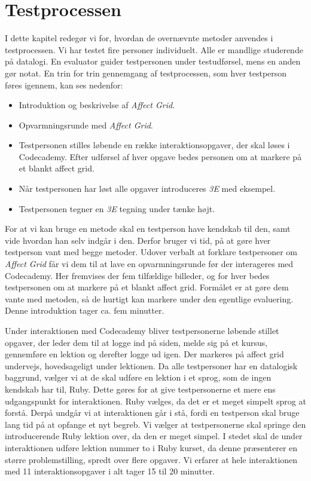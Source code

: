 \chapter{Testprocessen}\label{ch:evaproc}
I dette kapitel redegør vi for, hvordan de overnævnte metoder anvendes i testprocessen. Vi har testet fire personer individuelt. Alle er mandlige studerende på datalogi. En evaluator guider testpersonen under testudførsel, mens en anden gør notat. En trin for trin gennemgang af testprocessen, som hver testperson føres igennem, kan ses nedenfor:

\begin{itemize}
\item Introduktion og beskrivelse af \textit{Affect Grid}.
\item Opvarmningsrunde med \textit{Affect Grid}.
\item Testpersonen stilles løbende en række interaktionsopgaver, der skal løses i Codecademy. Efter udførsel af hver opgave bedes personen om at markere på et blankt affect grid.
\item Når testpersonen har løst alle opgaver introduceres \textit{3E} med eksempel.
\item Testpersonen tegner en \textit{3E} tegning under tænke højt.
\end{itemize}

For at vi kan bruge en metode skal en testperson have kendskab til den, samt vide hvordan han selv indgår i den. Derfor bruger vi tid, på at gøre hver testperson vant med begge metoder.  
Udover verbalt at forklare testpersoner om \textit{Affect Grid} får vi dem til at lave en opvarmningsrunde før der interageres med Codecademy. Her fremvises der fem tilfældige billeder, og for hver bedes testpersonen om at markere på et blankt affect grid. Formålet er at gøre dem vante med metoden, så de hurtigt kan markere under den egentlige evaluering. Denne introduktion tager ca. fem minutter.

Under interaktionen med Codecademy bliver testpersonerne løbende stillet opgaver, der leder dem til at logge ind på siden, melde sig på et kursus, gennemføre en lektion og derefter logge ud igen. Der markeres på affect grid undervejs, hovedsageligt under lektionen.
Da alle testpersoner har en datalogisk baggrund, vælger vi at de skal udføre en lektion i et sprog, som de ingen kendskab har til, Ruby. Dette gøres for at give testpersonerne et mere ens udgangspunkt for interaktionen. Ruby vælges, da det er et meget simpelt sprog at forstå. Derpå undgår vi at interaktionen går i stå, fordi en testperson skal bruge lang tid på at opfange et nyt begreb. Vi vælger at testpersonerne skal springe den introducerende Ruby lektion over, da den er meget simpel. I stedet skal de under interaktionen udføre lektion nummer to i Ruby kurset, da denne præsenterer en større problemstilling, spredt over flere opgaver. Vi erfarer at hele interaktionen med 11 interaktionsopgaver i alt tager 15 til 20 minutter. 

